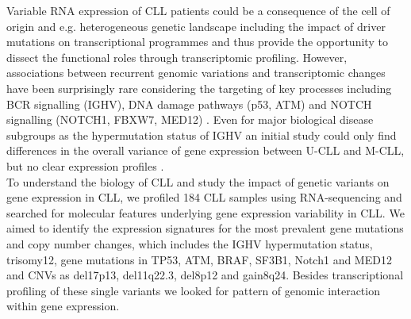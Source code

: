 Variable RNA expression of CLL patients could be a consequence of the cell of origin and e.g. heterogeneous genetic landscape including the impact of driver mutations on transcriptional programmes and thus provide the opportunity to dissect the functional roles through transcriptomic profiling. However, associations between recurrent genomic variations and transcriptomic changes have been surprisingly rare considering the targeting of key processes including BCR signalling (IGHV), DNA damage pathways (p53, ATM) and NOTCH signalling (NOTCH1, FBXW7, MED12) \citep{Landau2013, Puente2011a, Rossi2016a}. Even for major biological disease subgroups as the hypermutation status of IGHV an initial study could only find differences in the overall variance of gene expression between U-CLL and M-CLL, but no clear expression profiles \citep{Ecker2015}. \\

To understand the biology of CLL and study the impact of genetic variants on gene expression in CLL, we profiled 184 CLL samples using RNA-sequencing and searched for molecular features underlying gene expression variability in CLL. We aimed to identify the expression signatures for the most prevalent gene mutations and copy number changes, which includes the IGHV hypermutation status, trisomy12, gene mutations in TP53, ATM, BRAF, SF3B1, Notch1 and MED12 and CNVs as del17p13, del11q22.3, del8p12 and gain8q24. Besides transcriptional profiling of these single variants we looked for pattern of genomic interaction within gene expression. 


